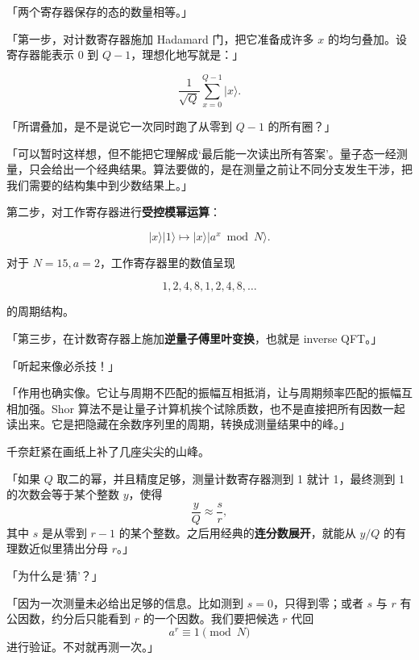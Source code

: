 「两个寄存器保存的态的数量相等。」

「第一步，对计数寄存器施加 Hadamard 门，把它准备成许多 $x$ 的均匀叠加。设寄存器能表示 $0$ 到 $Q-1$，理想化地写就是：」

\begin{equation}
\frac{1}{\sqrt{Q}}\sum_{x=0}^{Q-1}\lvert x\rangle.
\end{equation}

「所谓叠加，是不是说它一次同时跑了从零到 $Q-1$ 的所有圈？」

「可以暂时这样想，但不能把它理解成‘最后能一次读出所有答案’。量子态一经测量，只会给出一个经典结果。算法要做的，是在测量之前让不同分支发生干涉，把我们需要的结构集中到少数结果上。」

第二步，对工作寄存器进行\textbf{受控模幂运算}：

\begin{equation}
\lvert x\rangle\lvert 1\rangle
\longmapsto
\lvert x\rangle\lvert a^x \bmod N\rangle.
\end{equation}

对于 $N=15,a=2$，工作寄存器里的数值呈现

\begin{equation}
1,2,4,8,1,2,4,8,\ldots
\end{equation}

的周期结构。

「第三步，在计数寄存器上施加\textbf{逆量子傅里叶变换}，也就是 inverse QFT。」

「听起来像必杀技！」

「作用也确实像。它让与周期不匹配的振幅互相抵消，让与周期频率匹配的振幅互相加强。Shor 算法不是让量子计算机挨个试除质数，也不是直接把所有因数一起读出来。它是把隐藏在余数序列里的周期，转换成测量结果中的峰。」

千奈赶紧在画纸上补了几座尖尖的山峰。

「如果 $Q$ 取二的幂，并且精度足够，测量计数寄存器测到 1 就计 1，最终测到 1 的次数会等于某个整数 $y$，使得
\begin{equation}
\frac{y}{Q}\approx\frac{s}{r},
\end{equation}
其中 $s$ 是从零到 $r-1$ 的某个整数。之后用经典的\textbf{连分数展开}，就能从 $y/Q$ 的有理数近似里猜出分母 $r$。」

「为什么是‘猜’？」

「因为一次测量未必给出足够的信息。比如测到 $s=0$，只得到零；或者 $s$ 与 $r$ 有公因数，约分后只能看到 $r$ 的一个因数。我们要把候选 $r$ 代回
\begin{equation}
a^r\equiv1\pmod N
\end{equation}
进行验证。不对就再测一次。」

